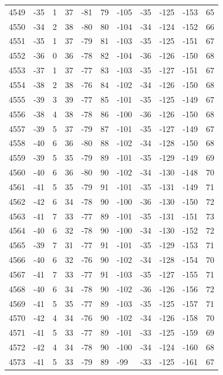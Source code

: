 \begin{table}[H]
\begin{tabular}{lllllllllll}
4549 & -35 & 1 & 37 & -81 & 79 & -105 & -35 & -125 & -153 & 65 \\
4550 & -34 & 2 & 38 & -80 & 80 & -104 & -34 & -124 & -152 & 66 \\
4551 & -35 & 1 & 37 & -79 & 81 & -103 & -35 & -125 & -151 & 67 \\
4552 & -36 & 0 & 36 & -78 & 82 & -104 & -36 & -126 & -150 & 68 \\
4553 & -37 & 1 & 37 & -77 & 83 & -103 & -35 & -127 & -151 & 67 \\
4554 & -38 & 2 & 38 & -76 & 84 & -102 & -34 & -126 & -150 & 68 \\
4555 & -39 & 3 & 39 & -77 & 85 & -101 & -35 & -125 & -149 & 67 \\
4556 & -38 & 4 & 38 & -78 & 86 & -100 & -36 & -126 & -150 & 68 \\
4557 & -39 & 5 & 37 & -79 & 87 & -101 & -35 & -127 & -149 & 67 \\
4558 & -40 & 6 & 36 & -80 & 88 & -102 & -34 & -128 & -150 & 68 \\
4559 & -39 & 5 & 35 & -79 & 89 & -101 & -35 & -129 & -149 & 69 \\
4560 & -40 & 6 & 36 & -80 & 90 & -102 & -34 & -130 & -148 & 70 \\
4561 & -41 & 5 & 35 & -79 & 91 & -101 & -35 & -131 & -149 & 71 \\
4562 & -42 & 6 & 34 & -78 & 90 & -100 & -36 & -130 & -150 & 72 \\
4563 & -41 & 7 & 33 & -77 & 89 & -101 & -35 & -131 & -151 & 73 \\
4564 & -40 & 6 & 32 & -78 & 90 & -100 & -34 & -130 & -152 & 72 \\
4565 & -39 & 7 & 31 & -77 & 91 & -101 & -35 & -129 & -153 & 71 \\
4566 & -40 & 6 & 32 & -76 & 90 & -102 & -34 & -128 & -154 & 70 \\
4567 & -41 & 7 & 33 & -77 & 91 & -103 & -35 & -127 & -155 & 71 \\
4568 & -40 & 6 & 34 & -78 & 90 & -102 & -36 & -126 & -156 & 72 \\
4569 & -41 & 5 & 35 & -77 & 89 & -103 & -35 & -125 & -157 & 71 \\
4570 & -42 & 4 & 34 & -76 & 90 & -102 & -34 & -126 & -158 & 70 \\
4571 & -41 & 5 & 33 & -77 & 89 & -101 & -33 & -125 & -159 & 69 \\
4572 & -42 & 4 & 34 & -78 & 90 & -100 & -34 & -124 & -160 & 68 \\
4573 & -41 & 5 & 33 & -79 & 89 & -99 & -33 & -125 & -161 & 67 \\

\end{tabular}
\end{table}
